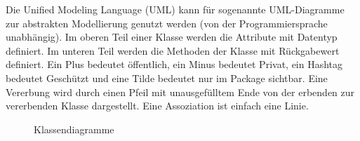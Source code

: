 Die Unified Modeling Language (UML) kann für sogenannte UML-Diagramme zur abstrakten
Modellierung genutzt werden (von der Programmiersprache unabhängig).
Im oberen Teil einer Klasse werden die Attribute mit Datentyp definiert.
Im unteren Teil werden die Methoden der Klasse mit Rückgabewert definiert.
Ein Plus bedeutet öffentlich, ein Minus bedeutet Privat, ein Hashtag
bedeutet Geschützt und eine Tilde bedeutet nur im Package sichtbar.
Eine Vererbung wird durch einen Pfeil mit unausgefülltem Ende von der erbenden
zur vererbenden Klasse dargestellt. Eine Assoziation ist einfach eine Linie.

\vspace*{0.5cm}
\begin{figure}[H]
\begin{center}
    \caption{Klassendiagramme}
\end{center}
\end{figure}

